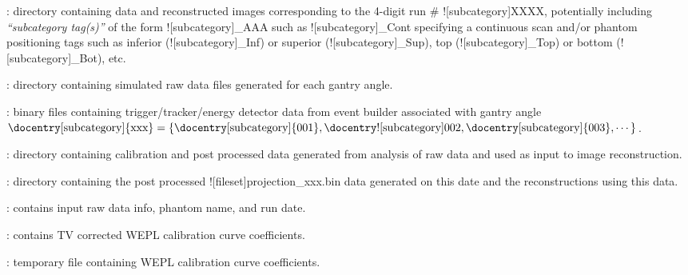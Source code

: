 \begin{tcbenvironment}
\begin{tcbparagraph}
\begin{ThinEnum}
\begin{ThinEnum}
\begin{ThinEnum}
                \begin{ThinEnum}
				\item {} : directory containing data and reconstructed images corresponding to the 4-digit run \# \docentry![subcategory]{XXXX}, potentially including \emph{``subcategory tag(s)''} of the form \docentry![subcategory]{\_AAA} such as  \docentry![subcategory]{\_Cont} specifying a continuous scan and/or phantom positioning tags such as inferior (\docentry![subcategory]{\_Inf}) or superior (\docentry![subcategory]{\_Sup}), top (\docentry![subcategory]{\_Top}) or bottom (\docentry![subcategory]{\_Bot}), etc.
                    \begin{ThinEnum}
                        \item {} : directory containing simulated raw data files generated for each gantry angle.
                        \begin{ThinEnum}
                            \item {} : binary files containing trigger/tracker/energy detector data from event builder associated with gantry angle $\text{\docentry[subcategory]{xxx}} =\{\text{\docentry[subcategory]{001}}, \text{\docentry![subcategory]{002}}, \text{\docentry[subcategory]{003}}, \cdots\}$.
                        \end{ThinEnum}
                        \item {} : directory containing calibration and post processed data generated from analysis of raw data and used as input to image reconstruction.
                        \begin{ThinEnum}
                            \item {} : directory containing the post processed \docentry![fileset]{projection\_xxx.bin} data generated on this date and the reconstructions using this data.
                            \begin{ThinEnum}
                        		\item {} : contains input raw data info, phantom name, and run date.
                    			\item {} : contains TV corrected WEPL calibration curve coefficients.
						\item {} : temporary file containing WEPL calibration curve coefficients.

\end{ThinEnum}
\end{ThinEnum}
\end{ThinEnum}
\end{ThinEnum}
\end{ThinEnum}
\end{ThinEnum}
\end{ThinEnum}
\end{tcbparagraph}
\end{tcbenvironment}
